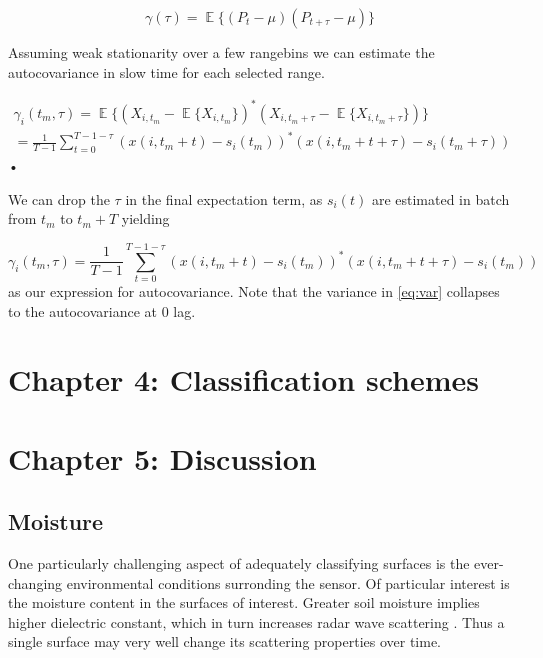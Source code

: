 \documentclass[a4paper, 12pt]{article}
\DeclareMathOperator*{\E}{\mathbb{E}}
\begin{document}
\begin{equation}
	\gamma(\tau) = \E\big\{(P_t - \mu)(P_{t+\tau} - \mu)\big\}
\end{equation}

Assuming weak stationarity over a few rangebins we can estimate the autocovariance in slow time for each selected range. 

\begin{equation}
\begin{gathered}
	\gamma_i(t_m, \tau) = \E\big\{(X_{i,t_m} - \E\{X_{i, t_m}\})^*(X_{i, t_m+\tau} - \E\{X_{i, t_m+\tau}\})\big\}\\
	= \frac{1}{T-1}\sum_{t=0}^{T-1-\tau}(x(i, t_m + t) - s_i(t_m))^*(x(i, t_m + t + \tau) - s_i(t_m + \tau))
\end{gathered}
\end{equation}•

We can drop the $\tau$ in the final expectation term, as $s_i(t)$ are estimated in batch from $t_m$ to  $t_m + T$ yielding

\begin{equation}
	\gamma_i(t_m, \tau) = \frac{1}{T-1}\sum_{t=0}^{T-1- \tau}(x(i, t_m + t) - s_i(t_m))^*(x(i, t_m + t + \tau) - s_i(t_m))
\end{equation}
as our expression for autocovariance. Note that the variance in \ref{eq:var} collapses to the autocovariance at 0 lag. 


\section{Chapter 4: Classification schemes}

\section{Chapter 5: Discussion}

\subsection{Moisture}

One particularly challenging aspect of adequately classifying surfaces is the ever-changing environmental conditions surronding the sensor. Of particular interest is the moisture content in the surfaces of interest. Greater soil moisture implies higher dielectric constant, which in turn increases radar wave scattering \cite{ct:moist}. Thus a single surface may very well change its scattering properties over time. 
\end{document}
